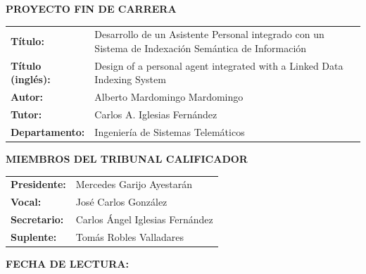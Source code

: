 \cleardoublepage
\thispagestyle{empty}
\vspace*{3\baselineskip}
{\large{\bf PROYECTO FIN DE CARRERA}}
\vspace{0.5cm}

\begin{rm}
\begin{tabular}{p{3cm}p{10cm}}
\textbf{Título:} & Desarrollo de un Asistente Personal integrado con un Sistema de Indexación Semántica de Información\\ 
\textbf{Título (inglés):} & Design of a personal agent integrated with a Linked Data Indexing System\\ 
\textbf{Autor:} & Alberto Mardomingo Mardomingo \\ 
\textbf{Tutor:} & Carlos A. Iglesias Fernández\\ 
\textbf{Departamento:} & Ingeniería de Sistemas Telemáticos \\ 
\end{tabular} \end{rm} \vspace{1cm}

{\large{\bf MIEMBROS DEL TRIBUNAL CALIFICADOR}} \vspace{0.5cm}

\begin{rm}
\begin{tabular}{p{3cm}p{10cm}}
\textbf{Presidente:} & Mercedes Garijo Ayestarán\\
\textbf{Vocal:} & José Carlos González\\
\textbf{Secretario:} & Carlos Ángel Iglesias Fernández\\
\textbf{Suplente:} & Tomás Robles Valladares
\end{tabular}
\end{rm}
\vspace{1cm}

{\large{\bf FECHA DE LECTURA:}}
\vspace{1cm}

